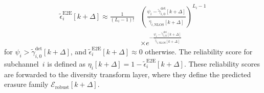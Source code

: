 \documentclass[lettersize,journal]{IEEEtran}
\begin{document}
\begin{equation}
\begin{split}
\tilde{\epsilon}_{i}^{\mathrm{E2E}}[k+\Delta] \approx \frac{1}{(L_i-1)!} &\left(\frac{\psi_i - \tilde{\gamma}_{i,0}^{\mathrm{det}}[k+\Delta]}{\tilde{\hat{\gamma}}_{i,\mathrm{NLOS}}[k+\Delta]}\right)^{L_i-1} \\
&\times e^{-\frac{\psi_i - \tilde{\gamma}_{i,0}^{\mathrm{det}}[k+\Delta]}{\tilde{\hat{\gamma}}_{i,\mathrm{NLOS}}[k+\Delta]}}
\end{split}
\label{eq:predicted_bler}
\end{equation}
for $\psi_i > \tilde{\gamma}_{i,0}^{\mathrm{det}}[k+\Delta]$, and $\tilde{\epsilon}_{i}^{\mathrm{E2E}}[k+\Delta] \approx 0$ otherwise. The reliability score for subchannel~$i$ is defined as
$
\eta_i[k+\Delta] = 1 - \tilde{\epsilon}_{i}^{\mathrm{E2E}}[k+\Delta].
$
These reliability scores are forwarded to the diversity transform 
layer, where they define the predicted erasure family 
$\mathcal{E}_{\mathrm{robust}}[k+\Delta]$.
\end{document}
